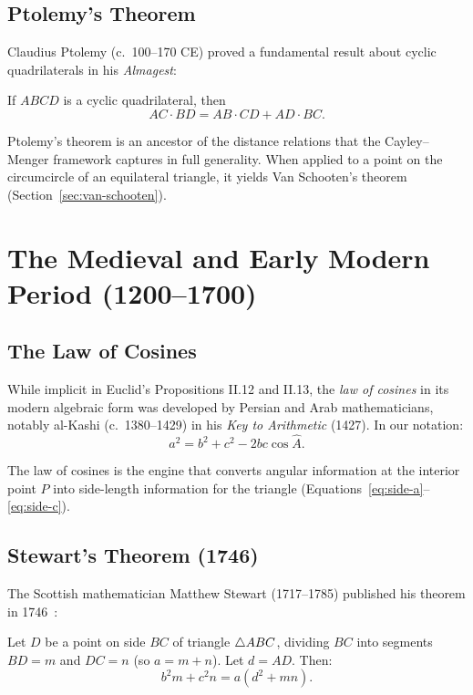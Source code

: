 \subsection{Ptolemy's Theorem}

Claudius Ptolemy (c.~100--170 CE) proved a fundamental result about cyclic quadrilaterals in his \emph{Almagest}:

\begin{theorem}
If $ABCD$ is a cyclic quadrilateral, then
\[
AC \cdot BD = AB \cdot CD + AD \cdot BC.
\]
\end{theorem}

Ptolemy's theorem is an ancestor of the distance relations that the Cayley--Menger framework captures in full generality. When applied to a point on the circumcircle of an equilateral triangle, it yields Van Schooten's theorem (Section~\ref{sec:van-schooten}).

\section{The Medieval and Early Modern Period (1200--1700)}

\subsection{The Law of Cosines}

While implicit in Euclid's Propositions II.12 and II.13, the \emph{law of cosines} in its modern algebraic form was developed by Persian and Arab mathematicians, notably al-Kashi (c.~1380--1429) in his \emph{Key to Arithmetic} (1427). In our notation:
\begin{equation}
\label{eq:law-of-cosines-hist}
a^2 = b^2 + c^2 - 2bc\cos\hat{A}.
\end{equation}

The law of cosines is the engine that converts angular information at the interior point $P$ into side-length information for the triangle (Equations~\ref{eq:side-a}--\ref{eq:side-c}).

\subsection{Stewart's Theorem (1746)}
\label{sec:stewart-hist}

The Scottish mathematician Matthew Stewart (1717--1785) published his theorem in 1746~\citep{stewart1746}:

\begin{theorem}
\label{thm:stewart-hist}
Let $D$ be a point on side $BC$ of triangle $\triangle ABC$, dividing $BC$ into segments $BD = m$ and $DC = n$ (so $a = m + n$). Let $d = AD$. Then:
\begin{equation}
b^2 m + c^2 n = a(d^2 + mn).
\end{equation}
\end{theorem}

